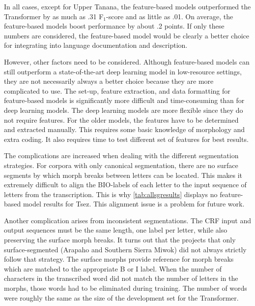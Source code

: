 In all cases, except for Upper Tanana, the feature-based models outperformed the Transformer by as much as .31 F$_1$-score and as little as .01. On average, the feature-based models boost performance by about .2 points. If only these numbers are considered, the feature-based model would be clearly a better choice for integrating into language documentation and description. 

However, other factors need to be considered. Although feature-based models can still outperform a state-of-the-art deep learning model in low-resource settings, they are not necessarily always a better choice because they are more complicated to use. The set-up, feature extraction, and data formatting for feature-based models is significantly more difficult and time-consuming than for deep learning models. The deep learning models are more flexible since they do not require features. For the older models, the features have to be determined and extracted manually. This requires some basic knowledge of morphology and extra coding. It also requires time to test different set of features for best results. 


The complications are increased when dealing with the different segmentation strategies. For corpora with only canonical segmentation, there are no surface segments by which morph breaks between letters can be located. This makes it extremely difficult to align the BIO-labels of each letter to the input sequence of letters from the transcription. This is why \autoref{tab:allsgresults} displays no feature-based model results for Tsez. This alignment issue is a problem for future work. 

Another complication arises from inconsistent segmentations. The CRF input and output sequences must be the same length, one label per letter, while also preserving the surface morph breaks. It turns out that the projects that only surface-segmented (Arapaho and Southern Sierra Miwok) did not always strictly follow that strategy. The surface morphs provide reference for morph breaks which are matched to the appropriate B or I label. When the number of characters in the transcribed word did not match the number of letters in the morphs, those words had to be eliminated during training. The number of words were roughly the same as the size of the development set for the Transformer.


